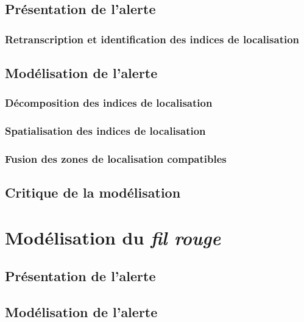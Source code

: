 \subsection{Présentation de l'alerte}
\label{subsec:9-2-1}

\subsubsection{Retranscription et identification des indices de localisation}
\label{subsec:9-2-1-1}

\subsection{Modélisation de l'alerte}
\label{subsec:9-2-2}

\subsubsection{Décomposition des indices de localisation}
\label{subsec:9-2-2-2}

\subsubsection{Spatialisation des indices de localisation}
\label{subsec:9-2-2-3}

\subsubsection{Fusion des zones de localisation compatibles}
\label{subsec:9-2-2-4}

\subsection{Critique de la modélisation}
\label{subsec:9-2-3}




\section{Modélisation du \emph{fil rouge}}
\label{sec:9-3}

\subsection{Présentation de l'alerte}
\label{subsec:9-3-1}

\subsection{Modélisation de l'alerte}
\label{subsec:9-3-2}

